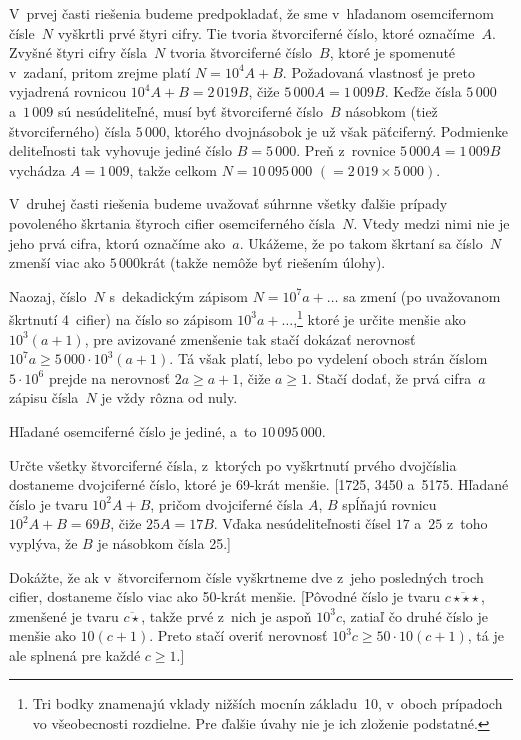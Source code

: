 {%
V~prvej časti riešenia budeme predpokladať, že sme v~hľadanom
osemcifernom čísle~$N$ vyškrtli prvé štyri cifry. Tie tvoria
štvorciferné číslo, ktoré označíme~$A$. Zvyšné štyri cifry čísla~$N$
tvoria štvorciferné číslo~$B$, ktoré je spomenuté v~zadaní, pritom
zrejme platí $N=10^4A+B$. Požadovaná vlastnosť je preto vyjadrená
rovnicou $10^4A+B=2\,019B$, čiže $5\,000A=1\,009B$. Keďže čísla
$5\,000$ a~$1\,009$ sú nesúdeliteľné, musí byť štvorciferné číslo~$B$
násobkom (tiež štvorciferného) čísla $5\,000$, ktorého dvojnásobok
je už však päťciferný. Podmienke deliteľnosti tak vyhovuje jediné
číslo $B=5\,000$. Preň z~rovnice $5\,000A=1\,009B$ vychádza $A=1\,009$,
takže celkom $N=10\,095\,000$ $(=2\,019\times5\,000)$.

V~druhej časti riešenia budeme uvažovať súhrnne všetky ďalšie
prípady povoleného škrtania štyroch cifier osemciferného čísla~$N$.
Vtedy medzi nimi nie je jeho prvá cifra, ktorú označíme ako~$a$.
Ukážeme, že po takom škrtaní sa číslo~$N$ zmenší viac ako $5\,000$\spojovnik{}krát (takže nemôže byť riešením
úlohy).

Naozaj, číslo~$N$ s~dekadickým zápisom $N=10^7a+\dots$
sa zmení (po uvažovanom škrtnutí 4~cifier)
na číslo so zápisom $10^3a+\dots$,\footnote{Tri bodky
znamenajú vklady nižších mocnín základu~10, v~oboch
prípadoch vo všeobecnosti rozdielne. Pre ďalšie úvahy nie je ich zloženie
podstatné.}
ktoré je určite menšie ako $10^3(a+1)$,
pre avizované zmenšenie tak stačí dokázať
nerovnosť $10^7a\ge5\,000\cdot10^3(a+1)$. Tá však platí, lebo
po vydelení oboch strán číslom $5\cdot10^{6}$ prejde na nerovnosť
$2a\ge a+1$, čiže $a\ge1$. Stačí dodať, že prvá cifra~$a$
zápisu čísla~$N$ je vždy rôzna od nuly.

\odpoved
Hľadané osemciferné číslo je jediné, a~to $10\,095\,000$.


Určte všetky štvorciferné čísla, z~ktorých po
vyškrtnutí prvého dvojčíslia dostaneme dvojciferné číslo, ktoré je
69-krát menšie. [1725, 3450 a~5175. Hľadané číslo je tvaru
$10^2A+B$, pričom dvojciferné čísla $A$, $B$ spĺňajú rovnicu
$10^2A+B=69B$, čiže $25A=17B$. Vďaka nesúdeliteľnosti čísel $17$
a~$25$ z~toho vyplýva, že $B$ je násobkom čísla 25.]

Dokážte, že ak v~štvorcifernom čísle vyškrtneme dve
z~jeho posledných troch cifier, dostaneme číslo viac ako 50-krát
menšie. [Pôvodné číslo je tvaru $\overline{c{\star}{\star}{\star}}$,
zmenšené je tvaru $\overline{c{\star}}$, takže prvé z~nich je aspoň
$10^3c$, zatiaľ čo druhé číslo je menšie ako $10(c+1)$. Preto stačí
overiť nerovnosť $10^3c\ge50\cdot10(c+1)$, tá je ale splnená
pre každé $c\ge1$.]

}
